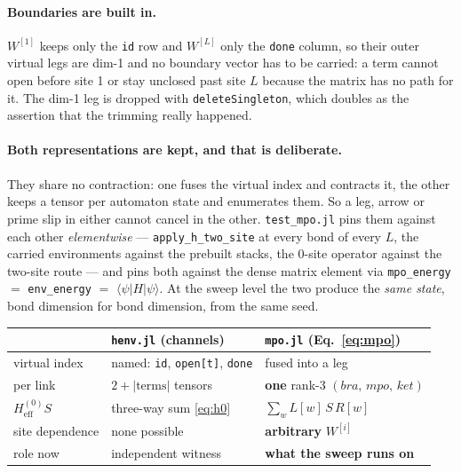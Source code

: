 \documentclass[11pt,a4paper]{article}
\newcommand{\code}[1]{\texttt{\small #1}}
\begin{document}
\paragraph{Boundaries are built in.} $W^{[1]}$ keeps only the \code{id} row and $W^{[L]}$ only
the \code{done} column, so their outer virtual legs are dim-1 and no boundary vector has to be
carried: a term cannot open before site 1 or stay unclosed past site $L$ because the matrix has
no path for it. The dim-1 leg is dropped with \code{deleteSingleton}, which doubles as the
assertion that the trimming really happened.

\paragraph{Both representations are kept, and that is deliberate.} They share no contraction:
one fuses the virtual index and contracts it, the other keeps a tensor per automaton state and
enumerates them. So a leg, arrow or prime slip in either cannot cancel in the other.
\code{test\_mpo.jl} pins them against each other \emph{elementwise} --- \code{apply\_h\_two\_site}
at every bond of every $L$, the carried environments against the prebuilt stacks, the 0-site
operator against the two-site route --- and pins both against the dense matrix element via
\code{mpo\_energy} $=$ \code{env\_energy} $=$ $\langle\psi|H|\psi\rangle$. At the sweep level the
two produce the \emph{same state}, bond dimension for bond dimension, from the same seed.

\begin{center}
\small
\begin{tabular}{@{}p{4.3cm}p{5.1cm}p{5.1cm}@{}}
\toprule
& \textbf{\code{henv.jl} (channels)} & \textbf{\code{mpo.jl} (Eq.\ \ref{eq:mpo})} \\
\midrule
virtual index & named: \code{id}, \code{open[t]}, \code{done} & fused into a leg \\
per link & $2+|\text{terms}|$ tensors & \textbf{one} rank-3 $(bra,\,mpo,\,ket)$ \\
$H^{(0)}_{\mathrm{eff}}S$ & three-way sum \eqref{eq:h0} & $\sum_w L[w]\,S\,R[w]$ \\
site dependence & none possible & \textbf{arbitrary} $W^{[i]}$ \\
role now & independent witness & \textbf{what the sweep runs on} \\
\bottomrule
\end{tabular}
\end{center}
\end{document}
